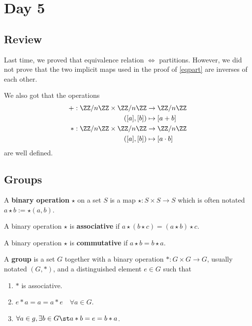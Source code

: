 \section{Day 5}

\subsection{Review}
Last time, we proved that equivalence relation $\Leftrightarrow$
partitions. However, we did not prove that the two implicit maps used in
the proof of \ref{eqpart} are inverses of each other.

We also got that the operations
\[ \begin{aligned}
+ : \ZZ/n\ZZ \times \ZZ/n\ZZ &\to \ZZ/n\ZZ \\
([a], [b]) &\mapsto [a + b] \\
* : \ZZ/n\ZZ \times \ZZ/n\ZZ &\to \ZZ/n\ZZ \\
([a], [b]) &\mapsto [a \cdot b] \\
\end{aligned} \]
are well defined.

\subsection{Groups}
\begin{df}
\label{binop}
A \textbf{binary operation} $\star$ on a set $S$ is a map $\star : S
\times S \to S$ which is often notated $a \star b := \star(a, b)$.
\end{df}

\begin{df}
\label{assoc}
A binary operation $\star$ is \textbf{associative} if $a \star (b \star
c) = (a \star b) \star c$.
\end{df}

\begin{df}
\label{commute}
A binary operation $\star$ is \textbf{commutative} if $a \star b = b
\star a$.
\end{df}

\begin{df}
\label{group}
A \textbf{group} is a set $G$ together with a binary operation $* : G
\times G \to G$, usually notated $(G, *)$, and a distinguished element
$e \in G$ such that
\begin{enumerate}
\item $*$ is associative.
\item $e * a = a = a * e \quad \forall a \in G$.
\item $\forall a \in g, \exists b \in G \st a * b = e = b * a$.
\end{enumerate}
\end{df}

